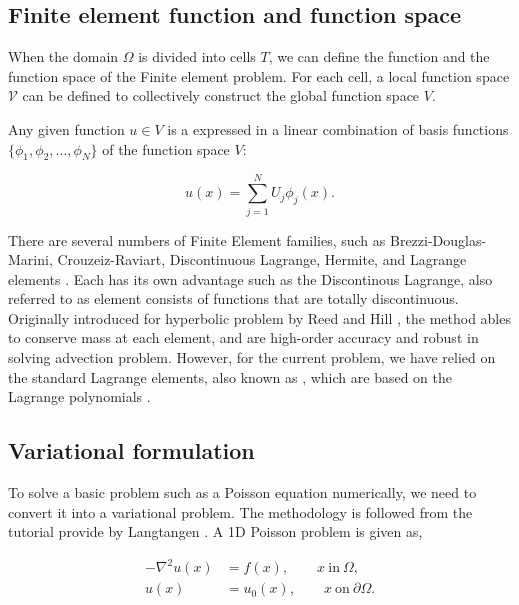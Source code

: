 \subsection*{Finite element function and function space}

When the domain $\Omega$ is divided into cells $T$, we can define the function and the function space of the Finite element problem. For each cell, a local function space $\mathcal{V}$ can be defined to collectively construct the global function space $V$.

Any given function $u \in V$ is a expressed in a linear combination of basis functions $\{\phi_1,\phi_2,...,\phi_N\}$  of the function space $V$:

	\begin{equation}
	u(x) = \sum_{j=1}^N U_j\phi_j(x).
	\end{equation}

There are several numbers of Finite Element families, such as Brezzi-Douglas-Marini, Crouzeiz-Raviart, Discontinuous Lagrange, Hermite, and Lagrange elements \cite{Logg2012a}. Each has its own advantage such as the Discontinous Lagrange, also referred to as  element consists of functions that are totally discontinuous. Originally introduced for hyperbolic problem by Reed and Hill \cite{Reed1973}, the method ables to conserve mass at each element, and are high-order accuracy and robust in solving advection problem. However, for the current problem, we have relied on the standard Lagrange elements, also known as , which are based on the Lagrange polynomials \cite{Chen2011}.

\subsection*{Variational formulation}
\label{subsec:variationalProblem}

To solve a basic problem such as a Poisson equation numerically, we need to convert it into a variational problem. The methodology is followed from the \fenics tutorial provide by Langtangen \cite{Langtangen2012}. A 1D Poisson problem is given as,

	\begin{subequations}
	\begin{align*}
	- \nabla^2 u(x) &= f(x), \qquad x\ \mathrm{in}\ \Omega,\\
	u(x) &= u_0(x), \qquad x\ \mathrm{on}\ \partial\Omega.
	\end{align*}
	\label{eq:poissonEq}
	\end{subequations}
	
